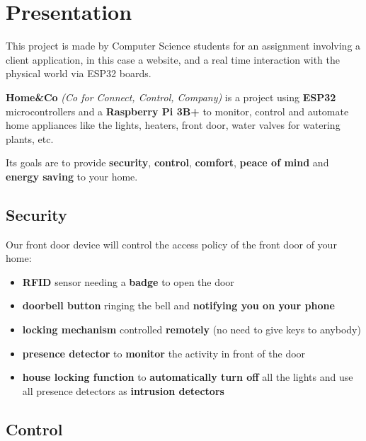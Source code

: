 \documentclass{report}
\begin{document}

\coverpage


\chapter{Presentation}\label{ch:presentation}

    This project is made by Computer Science students for an assignment involving a client application, in this case a website, and a real time interaction with the physical world via ESP32 boards.

    \textbf{Home\&Co} \emph{(Co for Connect, Control, Company)} is a project using \textbf{ESP32} microcontrollers and a \textbf{Raspberry Pi 3B+} to monitor, control and automate home appliances like the lights, heaters, front door, water valves for watering plants, etc.

    Its goals are to provide \textbf{security}, \textbf{control}, \textbf{comfort}, \textbf{peace of mind} and \textbf{energy saving} to your home.

    \section{Security}\label{sec:security}

        Our front door device will control the access policy of the front door of your home:
        \begin{itemize}
            \item \textbf{RFID} sensor needing a \textbf{badge} to open the door
            \item \textbf{doorbell button} ringing the bell and \textbf{notifying you on your phone}
            \item \textbf{locking mechanism} controlled \textbf{remotely} (no need to give keys to anybody)
            \item \textbf{presence detector} to \textbf{monitor} the activity in front of the door
            \item \textbf{house locking function} to \textbf{automatically turn off} all the lights and use all presence detectors as \textbf{intrusion detectors}
        \end{itemize}

    \section{Control}\label{sec:control}
\end{document}
